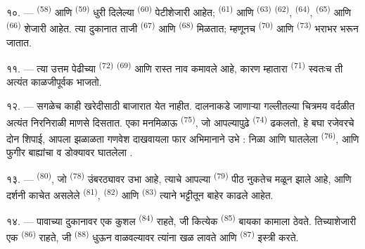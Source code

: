 १०. ---  \textsuperscript{(58)} आणि  \textsuperscript{(59)} धुरी
दिलेल्या  \textsuperscript{(60)} पेटीशेजारी आहेत; 
\textsuperscript{(61)} आणि  \textsuperscript{(63)} 
\textsuperscript{(62)},  \textsuperscript{(64)},
 \textsuperscript{(65)} आणि 
\textsuperscript{(66)} शेजारी आहेत. त्या दुकानात ताजी  \textsuperscript{(67)} आणि
 \textsuperscript{(68)} मिळतात; म्हणूनच 
\textsuperscript{(70)} आणि  \textsuperscript{(73)} भराभर भरून जातात.

११. --- त्या उत्तम पेढीच्या  \textsuperscript{(72)} 
\textsuperscript{(69)} आणि  रास्त नाव कमावले आहे, कारण म्हातारा
 \textsuperscript{(71)} स्वतःच ती अत्यंत काळजीपूर्वक भाजतो.

\VUsaut{4.0mm}
\VUsaut{3.0mm}

१२. --- सगळेच काही खरेदीसाठी बाजारात येत नाहीत. दालनाकडे जाणाऱ्या गल्लीतल्या चित्रमय वर्दळीत
अत्यंत निरनिराळी माणसे दिसतात. एका मनमिळाऊ 
\textsuperscript{(75)}, जो आपल्यापुढे  \textsuperscript{(74)} ढकलतो, हे बघा
रजेवरचे दोन शिपाई, आपला झळाळता गणवेश दाखवायला फार अभिमानाने उभे : निळा  आणि
 घातलेला  \textsuperscript{(76)}, आणि फुगीर बाह्यांचा व
डोक्यावर  घातलेला .

१३. ---  \textsuperscript{(80)}, जो 
\textsuperscript{(78)} उंबरठ्यावर उभा आहे, त्याचे आपल्या 
\textsuperscript{(79)} पीठ नुकतेच मळून झाले आहे, आणि दर्शनी काचेत असलेले
 \textsuperscript{(81)},  \textsuperscript{(82)} आणि
 \textsuperscript{(83)} त्याने भट्टीतून बाहेर काढले आहेत.

१४. --- पावाच्या दुकानावर एक कुशल  \textsuperscript{(84)} राहते, जी
कित्येक  \textsuperscript{(85)} बायका कामाला ठेवते. तिच्याशेजारी एक
 \textsuperscript{(86)} राहते, जी  \textsuperscript{(88)}
धुऊन वाळवल्यावर त्यांना खळ लावते आणि  \textsuperscript{(87)} इस्त्री करते.

\VUsaut{4.0mm}
\VUsaut{3.0mm}

